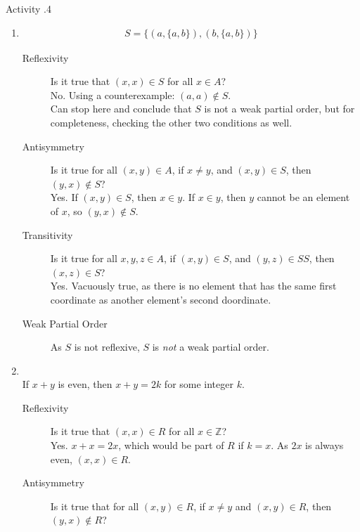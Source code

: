 \documentclass[../notes.tex]{subfiles}
\begin{document}
				\begin{exercise}{Activity \thechapter.4}
					\begin{enumerate}[label=(\alph*)]
						\item {}
							\begin{align*}
								S = \bigl\{(a, \{a, b\}), (b, \{a, b\})\bigr\}
							\end{align*}
							\begin{description}
								\item[Reflexivity] Is it true that $(x, x) \in S$ for all $x \in A$?\\
									No. Using a counterexample: $(a, a) \notin S$.\\
									Can stop here and conclude that $S$ is not a weak partial order, but for completeness, checking the other two conditions as well.
								\item[Antisymmetry] Is it true for all $(x, y) \in A$, if $x \neq y$, and $(x, y) \in S$, then $(y, x) \notin S$?\\
									Yes. If $(x, y) \in S$, then $x \in y$. If $x \in y$, then $y$ cannot be an element of $x$, so $(y, x) \notin S$.
								\item[Transitivity] Is it true for all $x, y, z \in A$, if $(x, y) \in S$, and $(y, z) \in SS$, then $(x, z) \in S$?\\
									Yes. Vacuously true, as there is no element that has the same first coordinate as another element's second doordinate.
								\item[Weak Partial Order] As $S$ is not reflexive, $S$ is \textit{not} a weak partial order.
							\end{description}
						\item {}\\
							If $x + y$ is even, then $x + y = 2k$ for some integer $k$.
							\begin{description}
								\item[Reflexivity] Is it true that $(x, x) \in R$ for all $x \in \mathbb{Z}$?\\
									Yes. $x + x = 2x$, which would be part of $R$ if $k = x$. As $2x$ is always even, $(x, x) \in R$.
								\item[Antisymmetry] Is it true that for all $(x, y) \in R$, if $x \neq y$ and $(x, y) \in R$, then $(y, x) \notin R$?\\

\end{description}
\end{enumerate}
\end{exercise}
\end{document}
